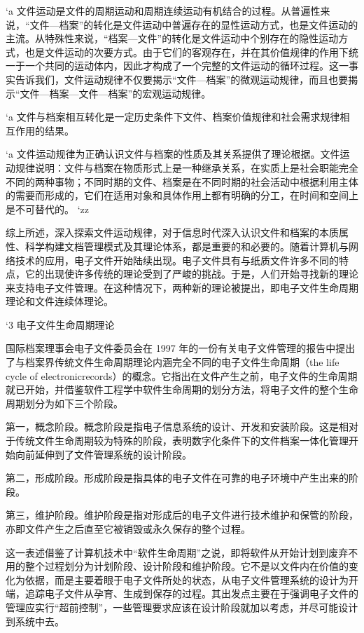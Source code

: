             `a 文件运动是文件的周期运动和周期连续运动有机结合的过程。从普遍性来说，“文件—档案”的转化是文件运动中普遍存在的显性运动方式，也是文件运动的主流。从特殊性来说，“档案—文件”的转化是文件运动中个别存在的隐性运动方式，也是文件运动的次要方式。由于它们的客观存在，并在其价值规律的作用下统一于一个共同的运动体内，因此才构成了一个完整的文件运动的循环过程。这一事实告诉我们，文件运动规律不仅要揭示“文件—档案”的微观运动规律，而且也要揭示“文件—档案—文件—档案”的宏观运动规律。

            `a 文件与档案相互转化是一定历史条件下文件、档案价值规律和社会需求规律相互作用的结果。

            `a 文件运动规律为正确认识文件与档案的性质及其关系提供了理论根据。文件运动规律说明：文件与档案在物质形式上是一种继承关系，在实质上是社会职能完全不同的两种事物；不同时期的文件、档案是在不同时期的社会活动中根据利用主体的需要而形成的，它们在适用对象和具体作用上都有明确的分工，在时间和空间上是不可替代的。
        `zz

    综上所述，深入探索文件运动规律，对于信息时代深入认识文件和档案的本质属性、科学构建文档管理模式及其理论体系，都是重要的和必要的。随着计算机与网络技术的应用，电子文件开始陆续出现。电子文件具有与纸质文件许多不同的特点，它的出现使许多传统的理论受到了严峻的挑战。于是，人们开始寻找新的理论来支持电子文件管理。在这种情况下，两种新的理论被提出，即电子文件生命周期理论和文件连续体理论。

    `3 电子文件生命周期理论

    国际档案理事会电子文件委员会在 1997 年的一份有关电子文件管理的报告中提出了与档案界传统文件生命周期理论内涵完全不同的电子文件生命周期（the life cycle of electronicrecords）的概念。它指出在文件产生之前，电子文件的生命周期就已开始，并借鉴软件工程学中软件生命周期的划分方法，将电子文件的整个生命周期划分为如下三个阶段。

    第一，概念阶段。概念阶段是指电子信息系统的设计、开发和安装阶段。这是相对于传统文件生命周期较为特殊的阶段，表明数字化条件下的文件档案一体化管理开始向前延伸到了文件管理系统的设计阶段。

    第二，形成阶段。形成阶段是指具体的电子文件在可靠的电子环境中产生出来的阶段。

    第三，维护阶段。维护阶段是指对形成后的电子文件进行技术维护和保管的阶段，亦即文件产生之后直至它被销毁或永久保存的整个过程。

    这一表述借鉴了计算机技术中“软件生命周期”之说，即将软件从开始计划到废弃不用的整个过程划分为计划阶段、设计阶段和维护阶段。它不是以文件内在价值的变化为依据，而是主要着眼于电子文件所处的状态，从电子文件管理系统的设计为开端，追踪电子文件从孕育、生成到保存的过程。其出发点主要在于强调电子文件的管理应实行“超前控制”，一些管理要求应该在设计阶段就加以考虑，并尽可能设计到系统中去。

